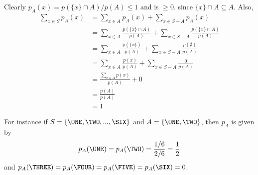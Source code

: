 
Clearly $p_A(x) = p(\{x\} \cap A) / p(A) \leq 1$ and is $\geq 0$.
since $\{x\} \cap A \subseteq A$.
Also,
\begin{align*}
\sum_{x \in S} p_A(x)
&= \sum_{x \in A} p_A(x) + \sum_{x \in S - A} p_A(x)\\
&= \sum_{x \in A} \frac{p(\{x\} \cap A)}{p(A)}
   + \sum_{x \in S - A} \frac{p(\{x\} \cap A)}{p(A)} \\
&= \sum_{x \in A} \frac{p(\{x\})}{p(A)}
   + \sum_{x \in S - A} \frac{p(\emptyset)}{p(A)} \\
&= \sum_{x \in A} \frac{p(x)}{p(A)} + \sum_{x \in S - A} \frac{0}{p(A)}\\
&= \frac{\sum_{x \in A} p(x)}{p(A)} + 0 \\
&= \frac{p(A)}{p(A)} \\
&= 1
\end{align*}

For instance if $S = \{\ONE, \TWO, ..., \SIX\}$ and $A = \{\ONE, \TWO\}$,
then $p_A$ is given by
\[
p_A(\ONE) = p_A(\TWO) = \frac{1/6}{2/6} = \frac{1}{2}
\]
and $p_A(\THREE) = p_A(\FOUR) = p_A(\FIVE) = p_A(\SIX) = 0$.
    

